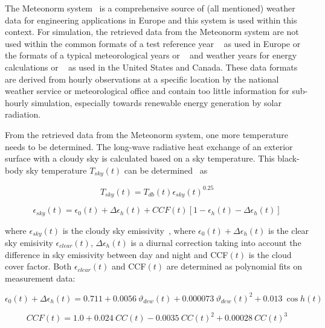 The Meteonorm system~\cite{Meteotest2008} is a comprehensive source of (all mentioned) weather data for engineering applications in Europe and this system is used within this context. For simulation, the retrieved data from the Meteonorm system are not used within the common formats of a test reference year ~\cite{NCDC1981,EC1985} as used in Europe or the formats of a typical meteorological years  or ~\cite{NCDC1976b,NREC1995} and weather years for energy calculations  or ~\cite{ASHRAE1985} as used in the United States and Canada. These data formats are derived from hourly observations at a specific location by the national weather service or meteorological office and contain too little information for sub-hourly simulation, especially towards renewable energy generation by solar radiation.

From the retrieved data from the Meteonorm system, one more temperature needs to be determined. The long-wave radiative heat exchange of an exterior surface with a cloudy sky is calculated based on a sky temperature. This black-body sky temperature $T_{sky}(t)$ can be determined~\cite{Walton1983,Martin1984} as

\begin{equation}
T_{sky}(t)=T_{db}(t)\epsilon_{sky}(t)^{0.25}
\end{equation}

\begin{equation}
\epsilon_{sky}(t) = \epsilon_{0}(t)+\Delta\epsilon_{h}(t)+CCF(t)\left[1-\epsilon_{h}(t)-\Delta\epsilon_{h}(t)\right]
\end{equation}

where $\epsilon_{sky}(t)$ is the cloudy sky emissivity~\cite{Berdahl1982,Berdahl1984,Martin1984}, where $\epsilon_{0}(t)+\Delta\epsilon_{h}(t)$ is the clear sky emisivity $\epsilon_{clear}(t)$, $\Delta\epsilon_{h}(t)$ is a diurnal correction taking into account the difference in sky emissivity between day and night and CCF$(t)$ is the cloud cover factor. Both  $\epsilon_{clear}(t)$ and CCF$(t)$ are determined as polynomial fits on measurement data:

\begin{equation}
\epsilon_{0}(t)+\Delta\epsilon_{h}(t) = 0.711 + 0.0056\ \vartheta_{dew}(t) + 0.000073\ \vartheta_{dew}(t)^{2} + 0.013\ \cos h(t)
\end{equation}

\begin{equation}
CCF(t) = 1.0 + 0.024\ CC(t) - 0.0035\ CC(t)^{2} + 0.00028\ CC(t)^{3}
\end{equation}

